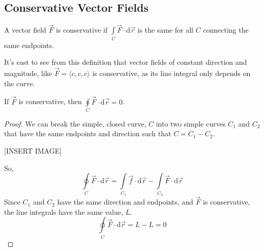 \subsection{Conservative Vector Fields}
\begin{definition}
	A vector field $\vec{F}$ is conservative if $\int\limits_{C}{\vec{F} \cdot \mathrm{d}\vec{r}}$ is the same for all $C$ connecting the same endpoints.
\end{definition}

\noindent
It's east to see from this definition that vector fields of constant direction and magnitude, like $\vec{F}=\langle c, c, c \rangle$ is conservative, as its line integral only depends on the curve.\\

\begin{theorem}
	If $\vec{F}$ is conservative, then $\oint\limits_{C}{\vec{F} \cdot \mathrm{d}\vec{r}} = 0$.
\end{theorem}
\begin{proof}
	We can break the simple, closed curve, $C$ into two simple curves $C_1$ and $C_2$ that have the same endpoints and direction such that $C = C_1-C_2$.
	
	[INSERT IMAGE]
	
	\noindent
	So, 
	\begin{equation*}
		\oint\limits_{C}{\vec{F} \cdot \mathrm{d}\vec{r}} = \int\limits_{C_1}{\vec{f} \cdot \mathrm{d}\vec{r}} - \int\limits_{C_2}{\vec{F} \cdot \mathrm{d}\vec{r}}
	\end{equation*}
	Since $C_1$ and $C_2$ have the same direction and endpoints, and $\vec{F}$ is conservative, the line integrals have the same value, $L$.
	\begin{equation*}
		\oint\limits_{C}{\vec{F} \cdot \mathrm{d}\vec{r}} = L - L = 0	
	\end{equation*}
\end{proof}